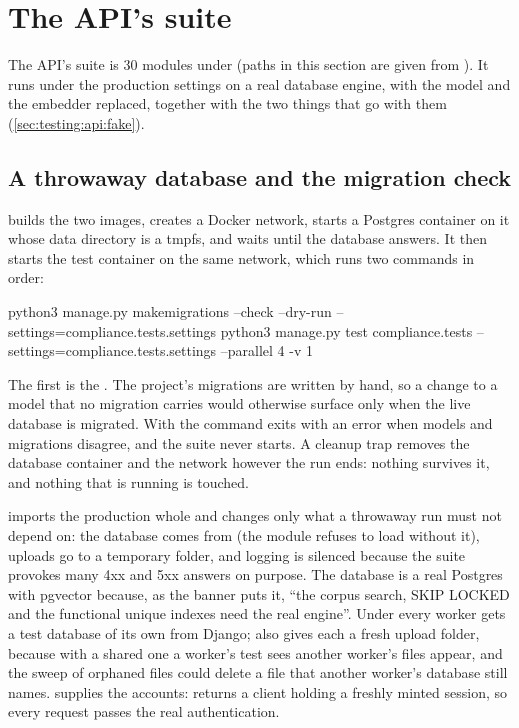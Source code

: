 \section{The API's suite}\label{sec:testing:api}

The API's suite is 30 modules under  (paths in this section are given from
). It runs under the production settings on a real database engine,
with the model and the embedder replaced, together with the two things that go with them
(\cref{sec:testing:api:fake}).

\subsection{A throwaway database and the migration check}\label{sec:testing:api:db}

 builds the two images, creates a Docker network, starts a Postgres
container on it whose data directory is a tmpfs, and waits until the database answers. It
then starts the test container on the same network, which runs two commands in order:

\begin{codeblock}
python3 manage.py makemigrations --check --dry-run --settings=compliance.tests.settings
python3 manage.py test compliance.tests --settings=compliance.tests.settings --parallel 4 -v 1
\end{codeblock}

The first is the . The project's migrations are written by hand, so a
change to a model that no migration carries would otherwise surface only when the live
database is migrated. With  the command exits with an error when models and
migrations disagree, and the suite never starts. A cleanup trap removes the database container
and the network however the run ends: nothing survives it, and nothing that is running is
touched.

 imports the production  whole and changes only
what a throwaway run must not depend on: the database comes from 
(the module refuses to load without it), uploads go to a temporary folder, and logging is
silenced because the suite provokes many 4xx and 5xx answers on purpose. The database is a
real Postgres with pgvector because, as the banner puts it, \enquote{the corpus search, SKIP
LOCKED and the functional unique indexes need the real engine}. Under  every
worker gets a test database of its own from Django;  also gives each a
fresh upload folder, because with a shared one a worker's test sees another worker's files
appear, and the sweep of orphaned files could delete a file that another worker's database still
names.  supplies the accounts:
 returns a client holding a freshly minted session, so every request passes
the real authentication.

